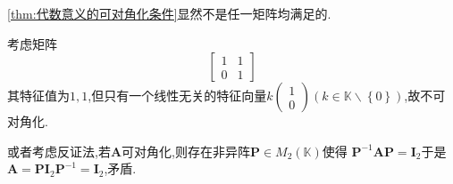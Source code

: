 \begin{red}
\begin{remark}
    \cref{thm:代数意义的可对角化条件}显然不是任一矩阵均满足的.
\end{remark}
\end{red}
\begin{brown}
\begin{example}
    考虑矩阵
    \[
    \begin{bmatrix}
        1&1\\
        0&1
    \end{bmatrix}
    \]其特征值为$1,1$,但只有一个线性无关的特征向量$k\begin{pmatrix}
        1\\0
    \end{pmatrix}\left(
        k\in\mathbb{K}\backslash \left\{0\right\}
    \right)$,故不可对角化.

    或者考虑反证法,若$\bm{A}$可对角化,则存在非异阵$\bm{P}\in M_2\left(
        \mathbb{K}
    \right)$使得
    $\bm{P}^{-1}\bm{AP}=\bm{I}_2$于是
    $\bm{A}=\bm{P}\bm{I}_2\bm{P}^{-1}=\bm{I}_2$,矛盾.
\end{example}
\end{brown}
